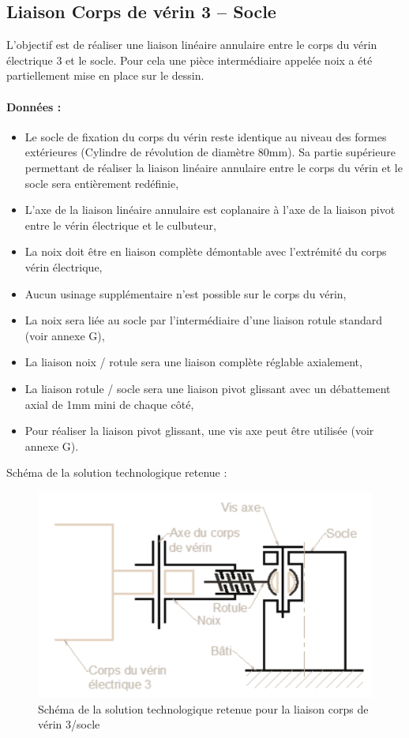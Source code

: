 \newpage

\subsection{Liaison Corps de vérin 3 – Socle}

L’objectif est de réaliser une liaison linéaire annulaire entre le corps du vérin électrique 3 et le socle. Pour cela une pièce intermédiaire appelée noix  a été partiellement  mise en place sur le dessin.

\paragraph{Données :}
\begin{itemize}
 \item Le socle de fixation du corps du vérin reste identique au niveau des formes extérieures (Cylindre de révolution de diamètre 80mm). Sa partie supérieure permettant de réaliser la liaison linéaire annulaire entre le corps du vérin et le socle sera entièrement redéfinie,
 \item L’axe de la liaison linéaire annulaire est coplanaire à l’axe de la liaison pivot entre le vérin électrique et le culbuteur,
 \item La noix doit être en liaison complète démontable avec l’extrémité du corps vérin électrique,
 \item Aucun usinage supplémentaire n’est possible sur le corps du vérin,
 \item La noix sera liée au socle par l’intermédiaire d’une liaison rotule standard (voir annexe G),
 \item La liaison noix / rotule sera une liaison complète réglable axialement,
 \item La liaison rotule / socle sera une liaison pivot glissant avec un débattement axial de 1mm mini de chaque côté,
 \item Pour réaliser la liaison pivot glissant, une vis axe peut être utilisée (voir annexe G).
\end{itemize}

Schéma de la solution technologique retenue :

\begin{figure}[!h]
\centering\includegraphics[width=0.6\linewidth]{img/fig15}
 \caption{Schéma de la solution technologique retenue pour la liaison corps de vérin 3/socle}
 \label{img15}
\end{figure}


